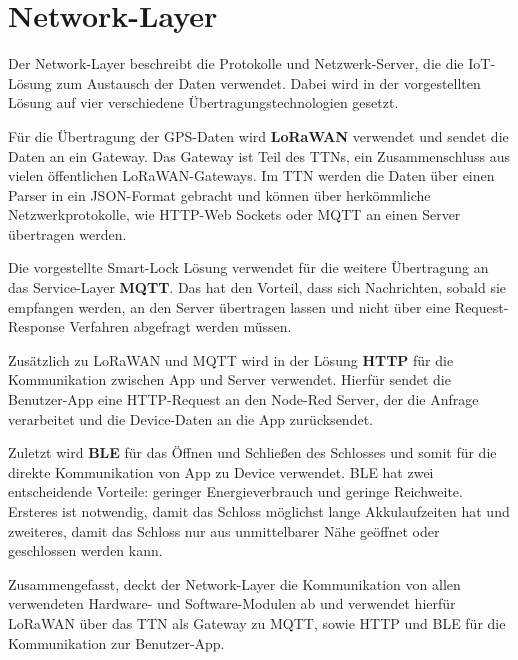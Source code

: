 
\section{Network-Layer} \label{network}
Der Network-Layer beschreibt die Protokolle und Netzwerk-Server, die die \ac{IoT}-Lösung zum Austausch der Daten verwendet. Dabei wird in der vorgestellten Lösung auf vier verschiedene Übertragungstechnologien gesetzt.

Für die Übertragung der \ac{GPS}-Daten wird \textbf{\ac{LoRaWAN}} verwendet und sendet die Daten an ein Gateway. Das Gateway ist Teil des \ac{TTN}s, ein Zusammenschluss aus vielen öffentlichen \ac{LoRaWAN}-Gateways. Im \ac{TTN} werden die Daten über einen Parser in ein \ac{JSON}-Format gebracht und können über herkömmliche Netzwerkprotokolle, wie \ac{HTTP}-Web Sockets oder \ac{MQTT} an einen Server übertragen werden.

Die vorgestellte Smart-Lock Lösung verwendet für die weitere Übertragung an das Service-Layer \textbf{\ac{MQTT}}. Das hat den Vorteil, dass sich Nachrichten, sobald sie empfangen werden, an den Server übertragen lassen und nicht über eine Request-Response Verfahren abgefragt werden müssen. 

Zusätzlich zu \ac{LoRaWAN} und \ac{MQTT} wird in der Lösung \textbf{\ac{HTTP}} für die Kommunikation zwischen App und Server verwendet. Hierfür sendet die Benutzer-App eine \ac{HTTP}-Request an den Node-Red Server, der die Anfrage verarbeitet und die Device-Daten an die App zurücksendet. 

Zuletzt wird \textbf{\ac{BLE}} für das Öffnen und Schließen des Schlosses und somit für die direkte Kommunikation von App zu Device verwendet. \ac{BLE} hat zwei entscheidende Vorteile: geringer Energieverbrauch und geringe Reichweite. Ersteres ist notwendig, damit das Schloss möglichst lange Akkulaufzeiten hat und zweiteres, damit das Schloss nur aus unmittelbarer Nähe geöffnet oder geschlossen werden kann.

Zusammengefasst, deckt der Network-Layer die Kommunikation von allen verwendeten Hardware- und Software-Modulen ab und verwendet hierfür \ac{LoRaWAN} über das \ac{TTN} als Gateway zu \ac{MQTT}, sowie \ac{HTTP} und \ac{BLE} für die Kommunikation zur Benutzer-App.